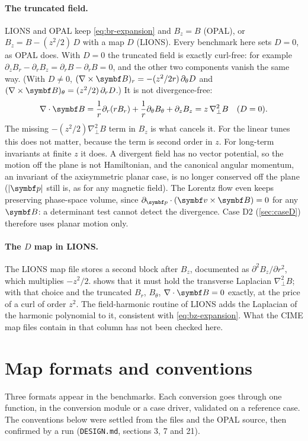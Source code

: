\paragraph{The truncated field.}
LIONS and OPAL keep \cref{eq:br-expansion} and $B_z = B$ (OPAL), or $B_z = B - (z^2/2)\,D$ with a map $D$ (LIONS).
Every benchmark here sets $D = 0$, as OPAL does.
With $D = 0$ the truncated field is exactly curl-free: for example $\partial_z B_r - \partial_r B_z = \partial_r B - \partial_r B = 0$,
and the other two components vanish the same way.
(With $D\ne0$, $(\nabla\times\vect B)_r = -(z^2/2r)\,\partial_\theta D$ and $(\nabla\times\vect B)_\theta = (z^2/2)\,\partial_r D$.)
It is not divergence-free:
\begin{equation}
\nabla\cdot\vect B = \frac{1}{r}\partial_r(r B_r) + \frac{1}{r}\partial_\theta B_\theta + \partial_z B_z
= z\,\nabla_\perp^2 B \quad (D = 0).
\end{equation}
The missing $-(z^2/2)\nabla_\perp^2B$ term in $B_z$ is what cancels it.
For the linear tunes this does not matter, because the term is second order in $z$.
For long-term invariants at finite $z$ it does.
A divergent field has no vector potential, so the motion off the plane is not Hamiltonian, and the canonical angular
momentum, an invariant of the axisymmetric planar case, is no longer conserved off the plane ($|\vect p|$ still is, as for any magnetic field).
The Lorentz flow even keeps preserving phase-space volume, since $\partial_{\vect p}\cdot(\vect v\times\vect B) = 0$ for any
$\vect B$: a determinant test cannot detect the divergence.
Case D2 (\cref{sec:caseD}) therefore uses planar motion only.

\paragraph{The $D$ map in LIONS.}
The LIONS map file stores a second block after $B_z$, documented as $\partial^2B_z/\partial r^2$, which multiplies $-z^2/2$.
 shows that it must hold the transverse Laplacian $\nabla_\perp^2B$; with that choice and the
truncated $B_r$, $B_\theta$, $\nabla\cdot\vect B = 0$ exactly, at the price of a curl of order $z^2$.
The field-harmonic routine of LIONS adds the Laplacian of the harmonic polynomial to it, consistent with
\cref{eq:bz-expansion}.
What the CIME map files contain in that column has not been checked here.

\section{Map formats and conventions}
Three formats appear in the benchmarks.
Each conversion goes through one function, in the conversion module or a case driver, validated on a reference case.
The conventions below were settled from the files and the OPAL source, then confirmed by a run (\texttt{DESIGN.md},
sections 3, 7 and 21).

